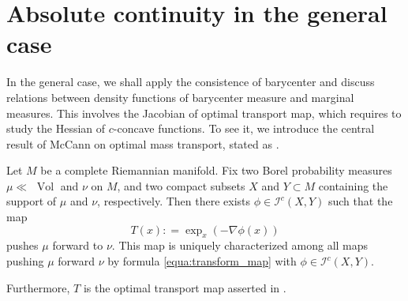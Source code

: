 \section{Absolute continuity in the general case}

In the general case, we shall apply the consistence of barycenter and
discuss relations between density functions of barycenter measure and marginal measures.
This involves the Jacobian of optimal transport map,
which requires to study the Hessian of $c$-concave functions.
To see it, we introduce the central result of McCann \cite{mccann2001polar} on optimal mass transport,
stated as \cite[Theorem 3.2]{cordero2001riemannian}.
\begin{thm}
	\label{thm:optimal_transport_manifold}
	Let \( M \) be a complete Riemannian manifold.
	Fix two Borel probability measures \( \mu \ll \) $\operatorname{Vol}$ and \( \nu \) on \( M \),
	and two compact subsets \( X \) and \( Y \subset M \) containing the support of \( \mu \) and \( \nu \),
	respectively.
	Then there exists \( \phi \in \mathcal { I } ^ { c } ( X , Y ) \) such that the map
	\begin{equation}
		\label{equa:transform_map}
		T ( x ) : = \exp _ { x } ( - \nabla \phi ( x ) )
	\end{equation}
	pushes \( \mu \) forward to \( \nu \).
	This map is uniquely characterized among all maps pushing \( \mu \) forward \( \nu \) by formula \cref{equa:transform_map} with \( \phi \in \mathcal{I} ^ { c } ( X , Y )\).

	Furthermore, $T$ is the optimal transport map asserted in .
\end{thm}

